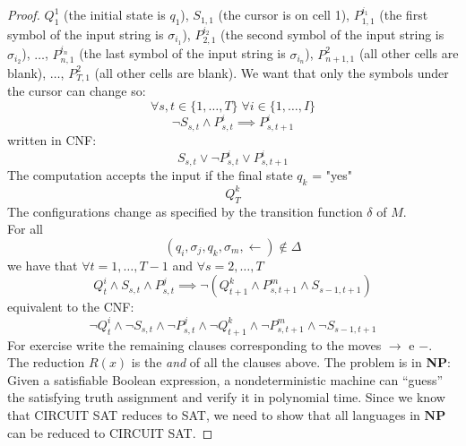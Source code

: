 \documentclass[12pt]{article}
\newcommand{\ra}{\rightarrow}
\newcommand{\la}{\leftarrow}
\begin{document}
\begin{proof}
 $Q^1_1$ (the initial state is $q_1$), $S_{1,1}$ (the cursor is on cell 1), $P^{i_1}_{1,1}$ (the first symbol of the input string is $\sigma_{i_1}$), $P^{i_2}_{2,1}$ (the second symbol of the input string is $\sigma_{i_2}$), $\dots$, $P^{i_n}_{n,1}$ (the last symbol of the input string is $\sigma_{i_n}$), $P^2_{n+1,1}$ (all other cells are blank), $\dots$, $P^2_{T,1}$ (all other cells are blank). We want that only the symbols under the cursor can change so:
 $$\forall s,t\in\{1,\dots,T\}\; \forall i\in\{1,\dots,I\}$$
 $$\neg S_{s,t}\land P^i_{s,t}\implies P^i_{s,t+1}$$
 written in CNF: 
 $$S_{s,t}\lor \neg P^i_{s,t}\lor P^i_{s,t+1}$$
  The computation accepts the input if the final state $q_k$ = "yes"
  $$Q^k_T$$
  The configurations change as specified by the transition function $\delta$ of $M$. \\
  For all $$(q_i,\sigma_j,q_k,\sigma_m,\la)\not\in\Delta$$
  we have that $\forall t=1,\dots,T-1$ and $\forall s=2,\dots,T$
  $$ Q^i_t\land S_{s,t}\land P^j_{s,t}\implies\neg(Q^k_{t+1}\land P^m_{s,t+1}\land S_{s-1,t+1})$$
  equivalent to the CNF:
  $$\neg Q^i_t\land \neg S_{s,t}\land \neg P^j_{s,t}\land\neg Q^k_{t+1}\land \neg P^m_{s,t+1}\land \neg S_{s-1,t+1}$$
For exercise write the remaining clauses corresponding to the moves $\ra$ e $-$.\\
The reduction $R(x)$ is the \emph{and} of all the clauses above.
The problem is in \textbf{NP}: Given a satisfiable Boolean expression, a nondeterministic machine can ``guess'' the satisfying truth assignment and verify it in polynomial time. Since we know that \textsc{CIRCUIT SAT} reduces to \textsc{SAT}, we need to show that all languages in $\mathbf{NP}$ can be reduced to \textsc{CIRCUIT SAT}.


\end{proof}
\end{document}

